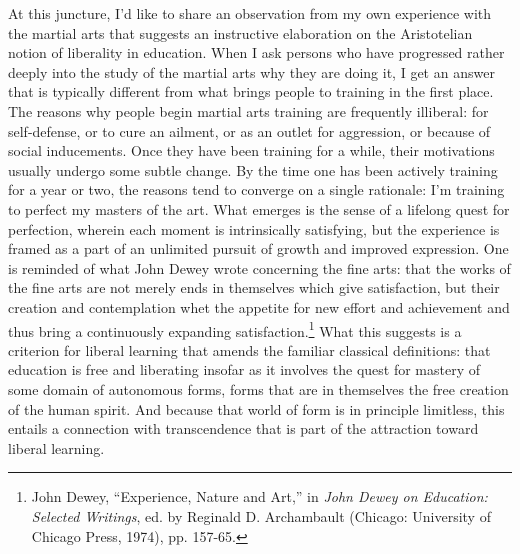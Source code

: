 At this juncture, I'd like to share an observation from my own experience with the martial arts that suggests an instructive elaboration on the Aristotelian notion of liberality in education. When I ask persons who have progressed rather deeply into the study of the martial arts why they are doing it, I get an answer that is typically different from what brings people to training in the first place. The reasons why people begin martial arts training are frequently illiberal: for self-defense, or to cure an ailment, or as an outlet for aggression, or because of social inducements. Once they have been training for a while, their motivations usually undergo some subtle change. By the time one has been actively training for a year or two, the reasons tend to converge on a single rationale: I'm training to perfect my masters of the art. What emerges is the sense of a lifelong quest for perfection, wherein each moment is intrinsically satisfying, but the experience is framed as a part of an unlimited pursuit of growth and improved expression. One is reminded of what John Dewey wrote concerning the fine arts: that the works of the fine arts are not merely ends in themselves which give satisfaction, but their creation and contemplation whet the appetite for new effort and achievement and thus bring a continuously expanding satisfaction.\footnote{John Dewey, ``Experience, Nature and Art,'' in \emph{John Dewey on Education: Selected Writings}, ed. by Reginald D. Archambault (Chicago: University of Chicago Press, 1974), pp. 157-65.} What this suggests is a criterion for liberal learning that amends the familiar classical definitions: that education is free and liberating insofar as it involves the quest for mastery of some domain of autonomous forms, forms that are in themselves the free creation of the human spirit. And because that world of form is in principle limitless, this entails a connection with transcendence that is part of the attraction toward liberal learning. 

